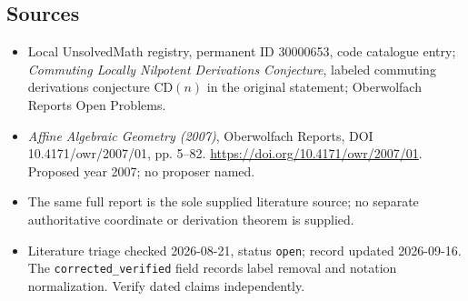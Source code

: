 \documentclass[11pt]{article}
\begin{document}
\subsection{Sources}
\begin{itemize}\item Local UnsolvedMath registry, permanent ID 30000653, code catalogue entry; \emph{Commuting Locally Nilpotent Derivations Conjecture}, labeled commuting derivations conjecture \(\mathrm{CD}(n)\) in the original statement; Oberwolfach Reports Open Problems.\item \emph{Affine Algebraic Geometry (2007)}, Oberwolfach Reports, DOI 10.4171/owr/2007/01, pp. 5--82. \url{https://doi.org/10.4171/owr/2007/01}. Proposed year 2007; no proposer named.\item The same full report is the sole supplied literature source; no separate authoritative coordinate or derivation theorem is supplied.\item Literature triage checked 2026-08-21, status \texttt{open}; record updated 2026-09-16. The \texttt{corrected\_verified} field records label removal and notation normalization. Verify dated claims independently.\end{itemize}
\end{document}
